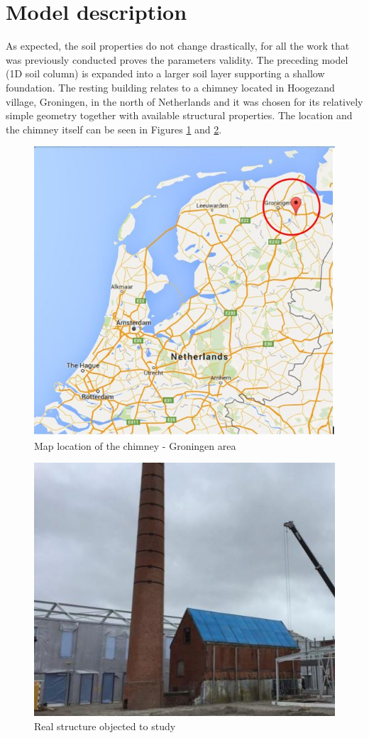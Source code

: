 	\section{Model description}
	As expected, the soil properties do not change drastically, for all the work that was previously conducted proves the parameters validity. The preceding model (1D soil column) is expanded into a larger soil layer supporting a shallow foundation. The resting building relates to a chimney located in Hoogezand village, Groningen, in  the north of Netherlands and it was chosen for its relatively simple geometry together with available structural properties. The location and the chimney itself can be seen in Figures \ref{Boom} and \ref{chimney}.
	
	\begin{figure}[!h]
		\centering
		\includegraphics[width=0.6 \linewidth]{"Boomgaard"}
		\caption{Map location of the chimney - Groningen area}
		\label{Boom}
	\end{figure} 
	
	\begin{figure}[!h]
		\centering
		\includegraphics[width=0.6 \linewidth]{"chimney"}
		\caption{Real structure objected to study}
		\label{chimney}
	\end{figure} 
	
